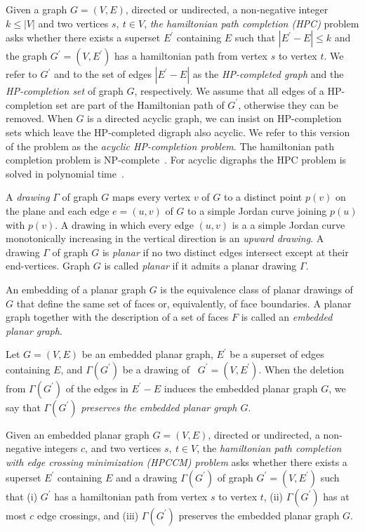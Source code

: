 \documentclass{myllncs-mixalis}
\begin{document}
Given a graph $G=(V,E)$, directed or undirected, a non-negative
integer $k \leq |V|$ and two vertices $s,~t \in V$, \emph{the
hamiltonian path completion (HPC)} problem asks whether there exists
a superset $E^\prime$ containing $E$ such that $|E^\prime- E| \leq
k$  and the graph $G^\prime = (V, E^\prime)$ has a hamiltonian path
from vertex $s$ to vertex $t$. We refer to  $G^\prime$ and to the
set of edges $|E^\prime- E|$ as the \emph{HP-completed graph} and
the \emph{HP-completion set} of graph $G$, respectively. We assume
that all edges of a HP-completion set are part of the Hamiltonian
path of $G^\prime$, otherwise they can be removed. When $G$ is a
directed acyclic graph, we can insist on HP-completion sets which
leave the HP-completed digraph also acyclic. We refer to this
version of the problem as the \emph{acyclic HP-completion problem}.
The hamiltonian path completion problem is
NP-complete~\cite{GareyJ79}. For
acyclic digraphs the  HPC problem is solved in polynomial time~\cite{KarejanM80}.

A \emph{drawing} $\Gamma$  of graph $G$ maps every vertex $v$ of $G$
to a distinct point $p(v)$ on the plane and each edge $e=(u,v)$ of
$G$ to a simple Jordan curve joining $p(u)$ with $p(v)$. A drawing
in which every edge $(u,v)$ is a a simple Jordan curve monotonically
increasing in the vertical direction is an \emph{upward  drawing}. A
drawing $\Gamma$ of graph $G$ is \emph{planar} if no two distinct
edges intersect except at their end-vertices. Graph $G$ is  called
\emph{planar} if it admits a planar drawing $\Gamma$.

An embedding of a planar graph $G$ is the equivalence class of
planar drawings of $G$ that define the same set of faces or,
equivalently, of face boundaries. A planar graph together with the
description of a set of faces $F$ is called an \emph{embedded planar
graph}.



Let $G=(V,E)$ be an embedded planar graph, $E^\prime$ be a superset
of   edges containing $E$, and $\Gamma(G^\prime)$ be a drawing of~
$G^\prime=(V, E^\prime)$. When the deletion from $\Gamma(G^\prime)$
of the edges in $E^\prime -E$ induces the embedded planar graph $G$,
we say that $\Gamma(G^\prime)$ \emph{preserves the embedded planar
graph $G$}.


\begin{definition}
\label{def:HPCCM} Given an embedded planar  graph   $G=(V,E)$,
directed or undirected, a non-negative integers $c$, and two
vertices $s,~t \in V$, the \emph{hamiltonian path completion with
edge crossing minimization (HPCCM) problem}  asks whether there
exists a superset $E^\prime$ containing $E$ and a drawing
$\Gamma(G^\prime)$ of graph $G^\prime = (V, E^\prime)$ such that (i)
$G^\prime$ has a hamiltonian path from vertex $s$ to vertex $t$,
(ii) $\Gamma(G^\prime)$ has at most $c$ edge crossings, and (iii)
$\Gamma(G^\prime)$ preserves the embedded planar graph $G$.
\end{definition}
\end{document}
